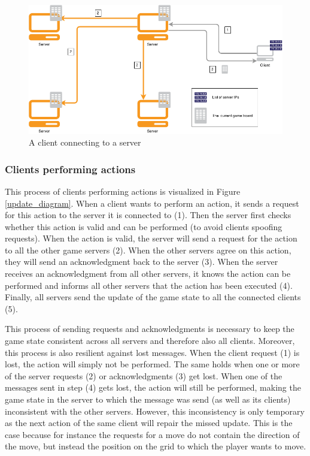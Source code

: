 \begin{figure}[h!]
  \centering
    \includegraphics[width=\textwidth]{diagrams/connecting-client}
    
  \caption{A client connecting to a server}
  \label{connect_diagram}
\end{figure}

\subsubsection*{Clients performing actions}
This process of clients performing actions is visualized in Figure \ref{update_diagram}. When a client wants to perform an action, it sends a request for this action to the server it is connected to (1). Then the server first checks whether this action is valid and can be performed (to avoid clients spoofing requests). When the action is valid, the server will send a request for the action to all the other game servers (2). When the other servers agree on this action, they will send an acknowledgment back to the server (3). When the server receives an acknowledgment from all other servers, it knows the action can be performed and informs all other servers that the action has been executed (4). Finally, all servers send the update of the game state to all the connected clients (5).

This process of sending requests and acknowledgments is necessary to keep the game state consistent across all servers and therefore also all clients. Moreover, this process is also resilient against lost messages. When the client request (1) is lost, the action will simply not be performed. The same holds when one or more of the server requests (2) or acknowledgments (3) get lost. When one of the messages sent in step (4) gets lost, the action will still be performed, making the game state in the server to which the message was send (as well as its clients) inconsistent with the other servers. However, this inconsistency is only temporary as the next action of the same client will repair the missed update. This is the case because for instance the requests for a move do not contain the direction of the move, but instead the position on the grid to which the player wants to move.

